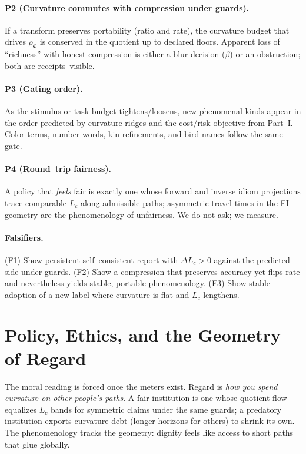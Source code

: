 \documentclass[11pt]{article}
\newcommand{\1}{\mathbf{1}}
\begin{document}
\paragraph{P2 (Curvature commutes with compression under guards).} If a transform preserves portability (ratio and rate), the curvature budget that drives $\rho_{\Phi}$ is conserved in the quotient up to declared floors. Apparent loss of ``richness'' with honest compression is either a blur decision ($\beta$) or an obstruction; both are receipts--visible.

\paragraph{P3 (Gating order).} As the stimulus or task budget tightens/loosens, new phenomenal kinds appear in the order predicted by curvature ridges and the cost/risk objective from Part~I. Color terms, number words, kin refinements, and bird names follow the same gate.

\paragraph{P4 (Round--trip fairness).} A policy that \emph{feels} fair is exactly one whose forward and inverse idiom projections trace comparable $L_c$ along admissible paths; asymmetric travel times in the FI geometry are the phenomenology of unfairness. We do not ask; we measure.

\paragraph{Falsifiers.} (F1) Show persistent self--consistent report with $\Delta L_c>0$ against the predicted side under guards. (F2) Show a compression that preserves accuracy yet flips rate and nevertheless yields stable, portable phenomenology. (F3) Show stable adoption of a new label where curvature is flat and $L_c$ lengthens.

\section{Policy, Ethics, and the Geometry of Regard}
\label{sec:ethics}

The moral reading is forced once the meters exist. Regard is \emph{how you spend curvature on other people's paths}. A fair institution is one whose quotient flow equalizes $L_c$ bands for symmetric claims under the same guards; a predatory institution exports curvature debt (longer horizons for others) to shrink its own. The phenomenology tracks the geometry: dignity feels like access to short paths that glue globally.
\end{document}
